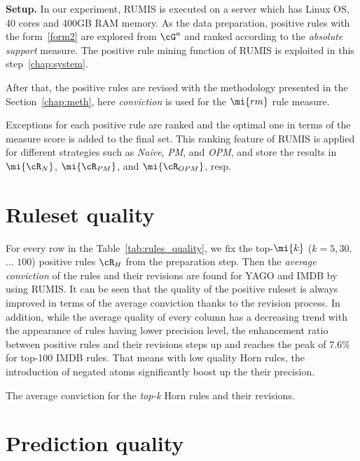 \textbf{Setup.} In our experiment, RUMIS is executed on a server which has Linux OS, 40 cores and 400GB RAM memory. As the data preparation, positive rules with the form~\ref{form2} are explored from $\cG^a$ and ranked according to the \textit{absolute support} measure. The positive rule mining function of RUMIS is exploited in this step~\ref{chap:system}.

After that, the positive rules are revised with the methodology presented in the Section~\ref{chap:meth}, here \textit{conviction} is used for the $\mi{rm}$ rule measure.

Exceptions for each positive rule are ranked and the optimal one in terms of the measure score is added to the final set. This ranking feature of RUMIS is applied for different strategies such as \emph{Naive}, \emph{PM}, and \emph{OPM}, and store the results in $\mi{\cR_{N}}$, $\mi{\cR_{PM}}$, and $\mi{\cR_{OPM}}$, resp.

\section{Ruleset quality}

For every row in the Table~\ref{tab:rules_quality}, we fix the top-$\mi{k}$ ($k=5,30,$ ... $100$) positive rules $\cR_{H}$ from the preparation step. Then the \textit{average conviction} of the rules and their revisions are found for YAGO and IMDB by using RUMIS. It can be seen that the quality of the positive ruleset is always improved in terms of the average conviction thanks to the revision process. In addition, while the average quality of every column has a decreasing trend with the appearance of rules having lower precision level, the enhancement ratio between positive rules and their revisions steps up and reaches the peak of $7.6\%$ for top-100 IMDB rules. That means with low quality Horn rules, the introduction of negated atoms significantly boost up the their precision.

\begin{table}[ht]
\centering
\footnotesize
\renewcommand*{\arraystretch}{1.07}
\centering

\smallskip
\caption{The average conviction for the \textit{top-k} Horn rules and their revisions.}
\label{tab:rules_quality}
\vspace*{-1.7\baselineskip}
\end{table}

\section{Prediction quality}

